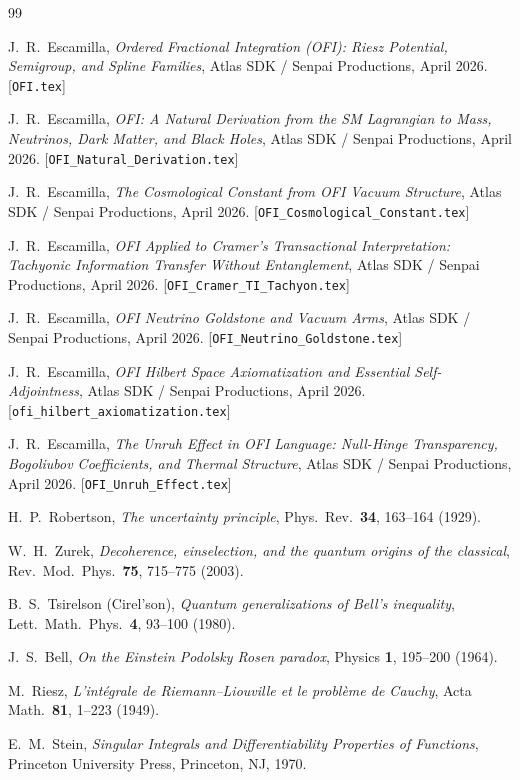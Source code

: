 \documentclass[12pt]{article}
\theoremstyle{definition}
\begin{document}
\newpage
\begin{thebibliography}{99}

J.~R.~Escamilla,
\textit{Ordered Fractional Integration (OFI): Riesz Potential, Semigroup,
and Spline Families},
Atlas SDK / Senpai Productions, April 2026.
[\texttt{OFI.tex}]

J.~R.~Escamilla,
\textit{OFI: A Natural Derivation from the SM Lagrangian to Mass, Neutrinos,
Dark Matter, and Black Holes},
Atlas SDK / Senpai Productions, April 2026.
[\texttt{OFI\_Natural\_Derivation.tex}]

J.~R.~Escamilla,
\textit{The Cosmological Constant from OFI Vacuum Structure},
Atlas SDK / Senpai Productions, April 2026.
[\texttt{OFI\_Cosmological\_Constant.tex}]

J.~R.~Escamilla,
\textit{OFI Applied to Cramer's Transactional Interpretation: Tachyonic
Information Transfer Without Entanglement},
Atlas SDK / Senpai Productions, April 2026.
[\texttt{OFI\_Cramer\_TI\_Tachyon.tex}]

J.~R.~Escamilla,
\textit{OFI Neutrino Goldstone and Vacuum Arms},
Atlas SDK / Senpai Productions, April 2026.
[\texttt{OFI\_Neutrino\_Goldstone.tex}]

J.~R.~Escamilla,
\textit{OFI Hilbert Space Axiomatization and Essential Self-Adjointness},
Atlas SDK / Senpai Productions, April 2026.
[\texttt{ofi\_hilbert\_axiomatization.tex}]

J.~R.~Escamilla,
\textit{The Unruh Effect in OFI Language: Null-Hinge Transparency,
Bogoliubov Coefficients, and Thermal Structure},
Atlas SDK / Senpai Productions, April 2026.
[\texttt{OFI\_Unruh\_Effect.tex}]

H.~P.~Robertson,
\textit{The uncertainty principle},
Phys.\ Rev.\ \textbf{34}, 163--164 (1929).

W.~H.~Zurek,
\textit{Decoherence, einselection, and the quantum origins of the classical},
Rev.\ Mod.\ Phys.\ \textbf{75}, 715--775 (2003).

B.~S.~Tsirelson (Cirel'son),
\textit{Quantum generalizations of Bell's inequality},
Lett.\ Math.\ Phys.\ \textbf{4}, 93--100 (1980).

J.~S.~Bell,
\textit{On the Einstein Podolsky Rosen paradox},
Physics \textbf{1}, 195--200 (1964).

M.~Riesz,
\textit{L'int\'{e}grale de Riemann--Liouville et le probl\`{e}me de Cauchy},
Acta Math.\ \textbf{81}, 1--223 (1949).

E.~M.~Stein,
\textit{Singular Integrals and Differentiability Properties of Functions},
Princeton University Press, Princeton, NJ, 1970.

\end{thebibliography}
\end{document}
